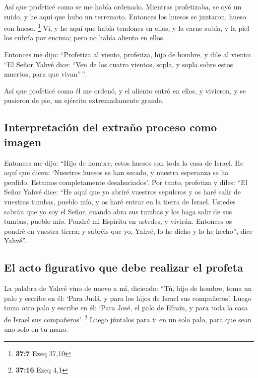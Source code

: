 \begin{paracol}{2}
 Así que profeticé como se me había ordenado. Mientras
profetizaba, se oyó un ruido, y he aquí que hubo un terremoto. Entonces
los huesos se juntaron, hueso con hueso. \footnote{\textbf{37:7} Ezeq
  37,10}  Vi, y he aquí que había tendones en ellos, y la
carne subía, y la piel los cubría por encima; pero no había aliento en
ellos.

 Entonces me dijo: ``Profetiza al viento, profetiza, hijo
de hombre, y dile al viento: ``El Señor Yahvé dice: ``Ven de los cuatro
vientos, sopla, y sopla sobre estos muertos, para que vivan''\,''.

 Así que profeticé como él me ordenó, y el aliento entró
en ellos, y vivieron, y se pusieron de pie, un ejército extremadamente
grande.

\hypertarget{interpretaciuxf3n-del-extrauxf1o-proceso-como-imagen}{%
\subsection{Interpretación del extraño proceso como
imagen}\label{interpretaciuxf3n-del-extrauxf1o-proceso-como-imagen}}

 Entonces me dijo: ``Hijo de hombre, estos huesos son
toda la casa de Israel. He aquí que dicen: `Nuestros huesos se han
secado, y nuestra esperanza se ha perdido. Estamos completamente
desahuciados'.  Por tanto, profetiza y diles: ``El Señor
Yahvé dice: ``He aquí que yo abriré vuestros sepulcros y os haré salir
de vuestras tumbas, pueblo mío, y os haré entrar en la tierra de Israel.
 Ustedes sabrán que yo soy el Señor, cuando abra sus
tumbas y los haga salir de sus tumbas, pueblo mío. 
Pondré mi Espíritu en ustedes, y vivirán. Entonces os pondré en vuestra
tierra; y sabréis que yo, Yahvé, lo he dicho y lo he hecho'', dice
Yahvé''.

\hypertarget{el-acto-figurativo-que-debe-realizar-el-profeta}{%
\subsection{El acto figurativo que debe realizar el
profeta}\label{el-acto-figurativo-que-debe-realizar-el-profeta}}

 La palabra de Yahvé vino de nuevo a mí, diciendo:
 ``Tú, hijo de hombre, toma un palo y escribe en él:
`Para Judá, y para los hijos de Israel sus compañeros'. Luego toma otro
palo y escribe en él: `Para José, el palo de Efraín, y para toda la casa
de Israel sus compañeros'. \footnote{\textbf{37:16} Ezeq 4,1}
 Luego júntalos para ti en un solo palo, para que sean
uno solo en tu mano.


\end{paracol}
